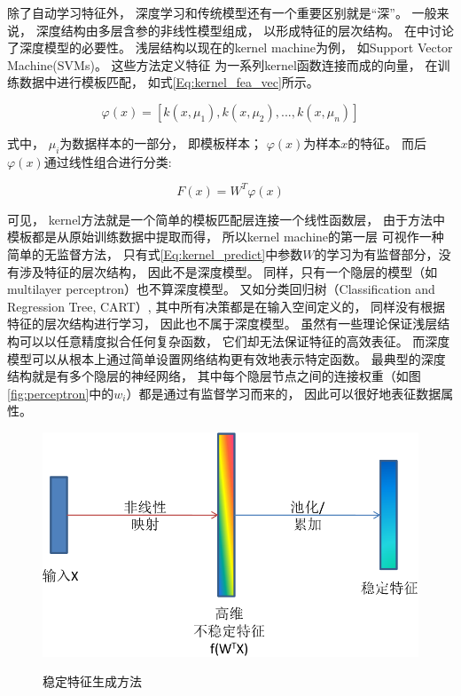 除了自动学习特征外， 深度学习和传统模型还有一个重要区别就是“深”。 一般来说， 深度结构由多层含参的非线性模型组成， 以形成特征的层次结构。
在\cite{bengio2007scaling,bengio2009learning}中讨论了深度模型的必要性。 浅层结构以现在的kernel machine\cite{scholkopf1999advances}为例， 如Support Vector Machine(SVMs)\cite{boser1992training,cortes1995support}。 这些方法定义特征
为一系列kernel函数连接而成的向量， 在训练数据中进行模板匹配， 如式\ref{Eq:kernel_fea_vec}所示。

\begin{equation}
	\label{Eq:kernel_fea_vec}
	\varphi(x) = [k(x,\mu_1),k(x,\mu_2),...,k(x,\mu_n)]
\end{equation}

式中， $\mu_i$为数据样本的一部分， 即模板样本； $\varphi(x)$为样本$x$的特征。 而后$\varphi(x)$通过线性组合进行分类:


\begin{equation}
	\label{Eq:kernel_predict}
	F(x) = W^T\varphi(x)
\end{equation}

可见， kernel方法就是一个简单的模板匹配层连接一个线性函数层， 由于方法中模板都是从原始训练数据中提取而得， 所以kernel machine的第一层
可视作一种简单的无监督方法， 只有式\ref{Eq:kernel_predict}中参数$W$的学习为有监督部分，没有涉及特征的层次结构， 因此不是深度模型。 同样，只有一个隐层的模型（如multilayer perceptron）也不算深度模型。 又如分类回归树（Classification and Regression Tree, CART）, 其中所有决策都是在输入空间定义的， 同样没有根据特征的层次结构进行学习， 因此也不属于深度模型。 虽然有一些理论保证浅层结构可以以任意精度拟合任何复杂函数\cite{hornik1989multilayer,hecht1989theory,komolgorov1956representation}， 它们却无法保证特征的高效表征。 而深度模型可以从根本上通过简单设置网络结构更有效地表示特定函数。 最典型的深度结构就是有多个隐层的神经网络， 其中每个隐层节点之间的连接权重（如图\ref{fig:perceptron}中的$w_i$）都是通过有监督学习而来的， 因此可以很好地表征数据属性。



\begin{figure}[htb]
  \centering
  \includegraphics[scale=0.8]{Pictures/CNN/invariant-feature-crop.pdf}\\
  \caption{稳定特征生成方法}\label{fig:invariant_feature_learning}
\end{figure}


